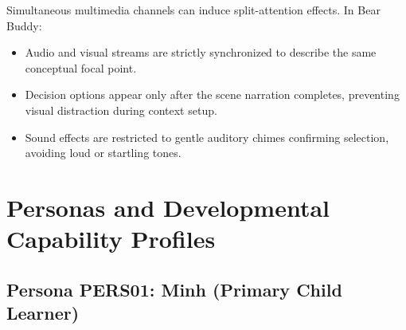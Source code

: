 Simultaneous multimedia channels can induce split-attention effects. In Bear Buddy:
\begin{itemize}
    \item Audio and visual streams are strictly synchronized to describe the same conceptual focal point.
    \item Decision options appear only after the scene narration completes, preventing visual distraction during context setup.
    \item Sound effects are restricted to gentle auditory chimes confirming selection, avoiding loud or startling tones.
\end{itemize}

\section{Personas and Developmental Capability Profiles}

\subsection{Persona PERS01: Minh (Primary Child Learner)}

